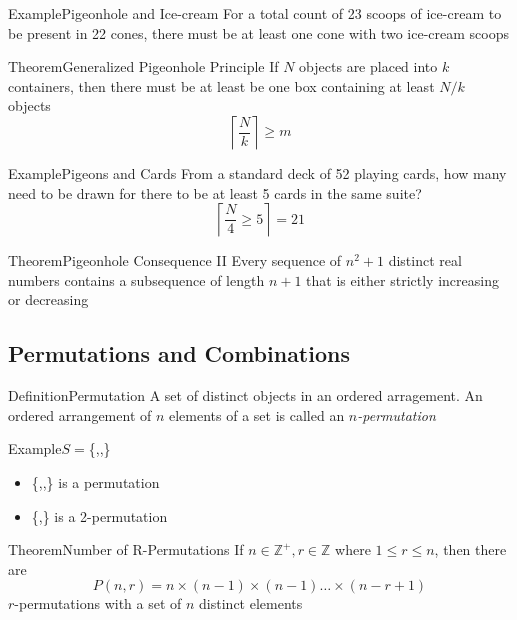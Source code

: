 \documentclass{MathNotes}
\newenvironment{example}[1]{\begin{BlueBox}{Example}{#1}}{\end{BlueBox}}
\newenvironment{definition}[1]{\begin{RedBox}{Definition}{#1}}{\end{RedBox}}
\newenvironment{theorem}[1]{\begin{GrayBox}{Theorem}{#1}}{\end{GrayBox}}
\begin{document}
\begin{example}{Pigeonhole and Ice-cream}\label{ex:pigeonhole-icecream-galore}
	For a total count of 23 scoops of ice-cream to be present in 22 cones,
	there must be at least one cone with two ice-cream scoops
\end{example}

\begin{multicols}{2}
	\begin{theorem}{Generalized Pigeonhole Principle}\label{th:generalized-pigenohole}
		If $N$ objects are placed into $k$ containers, then there must be at least
		be one box containing at least $N/k$ objects
		\[\left\lceil\frac{N}{k}\right\rceil\geq m\]
	\end{theorem}
	\begin{example}{Pigeons and Cards}\label{ex:pigenholes-and-cards}
		From a standard deck of 52 playing cards, how many need to be drawn for
		there to be at least 5 cards in the same suite?
		\[\left\lceil\frac{N}{4}\geq5\right\rceil=21\]
	\end{example}
\end{multicols}
\begin{theorem}{Pigeonhole Consequence II}\label{th:pigeonhole-2}
	Every sequence of $n^2+1$ distinct real numbers contains a subsequence
	of length $n+1$ that is either strictly increasing or decreasing
\end{theorem}

\subsection{Permutations and Combinations}\label{sec:permutations-combinations}
\begin{multicols}{2}
	\begin{definition}{Permutation}\label{def:permutation}
		A set of distinct objects in an ordered arragement. An ordered arrangement
		of $n$ elements of a set is called an \textit{$n$-permutation}
	\end{definition}
	\begin{example}{$S=$\{,,\}}\label{ex:permutation}
		\begin{itemize}
			\item\{,,\} is a permutation
			\item\{,\} is a 2-permutation
		\end{itemize}
	\end{example}
\end{multicols}
\begin{theorem}{Number of R-Permutations}\label{th:permutations-equation}
	If $n\in\mathbb{Z}^+,r\in\mathbb{Z}$ where $1\leq r\leq n$, then there are
	\[P(n,r)=n\times(n-1)\times(n-1)\ldots\times(n-r+1)\]
	$r$-permutations with a set of $n$ distinct elements
\end{theorem}
\end{document}
